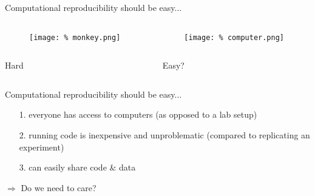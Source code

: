 
\begin{frame}{Computational reproducibility should be easy...}

  \begin{columns}
    \begin{column}{.5\textwidth}
      \begin{figure}
        \centering
        \texttt{[image: \%
          monkey.png]}  %
      \end{figure}
      
    \end{column}
    \begin{column}{.5\textwidth}

      \begin{figure}
        \centering
        \texttt{[image: \%
          computer.png]}  %
      \end{figure}
      
    \end{column}
  \end{columns}

  \begin{columns}
    \begin{column}{.5\textwidth}
      \begin{center}
        Hard
      \end{center}
      
    \end{column}
    \begin{column}{.5\textwidth}
      \begin{center}
        Easy?
      \end{center}
      
    \end{column}
  \end{columns}
  
\end{frame}


\begin{frame}{Computational reproducibility should be easy...}

  \begin{itemize}[leftmargin=1cm]

  \item[1.] everyone has access to computers (as opposed to a lab setup)
  \item[2.] running code is inexpensive and unproblematic (compared to replicating an experiment)
  \item[3.] can easily share code \& data 
    
    
  \end{itemize}

  \begin{center}
    $\Rightarrow$ Do we need to care?
  \end{center}

  
\end{frame}



